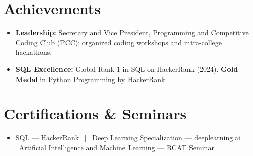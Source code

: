 \documentclass[a4paper,10pt]{article}
\begin{document}
\section{Achievements}
\begin{itemize}[noitemsep, leftmargin=*, topsep=2pt]
    \item \textbf{Leadership:} Secretary and Vice President, Programming and Competitive Coding Club (PCC); organized coding workshops and intra-college hackathons.
    \item \textbf{SQL Excellence:} Global Rank 1 in SQL on HackerRank (2024). \textbf{Gold Medal} in Python Programming by HackerRank.
\end{itemize}

\section{Certifications \& Seminars}
\begin{itemize}[noitemsep, leftmargin=*, topsep=2pt]
    \item SQL — HackerRank \ | \ Deep Learning Specialization — deeplearning.ai \ | \ Artificial Intelligence and Machine Learning — RCAT Seminar
\end{itemize}
\end{document}
